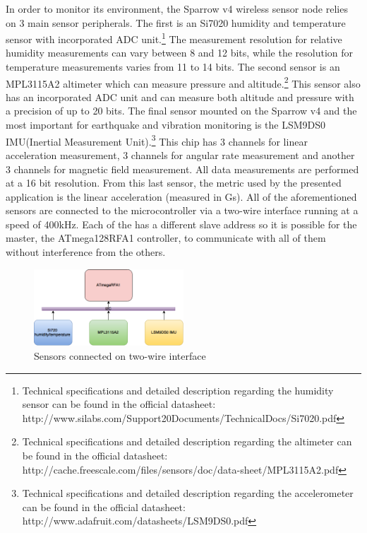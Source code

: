 In order to monitor its environment, the Sparrow v4 wireless sensor node relies on 3 main sensor peripherals. The first is 
an Si7020 humidity and temperature sensor with incorporated ADC unit.\footnote{Technical specifications and detailed description regarding the humidity sensor can be found in the official datasheet: http://www.silabs.com/Support20Documents/TechnicalDocs/Si7020.pdf}
The measurement resolution for relative humidity measurements
can vary between 8 and 12 bits, while the resolution for temperature measurements varies from 11 to 14 bits. The second sensor is 
an MPL3115A2 altimeter which can measure pressure and altitude.\footnote{Technical specifications and detailed description regarding the altimeter can be found in the official datasheet: http://cache.freescale.com/files/sensors/doc/data-sheet/MPL3115A2.pdf} 
This sensor also has an incorporated ADC unit and can measure 
both altitude and pressure with a precision of up to 20 bits. The final sensor mounted on the Sparrow v4 and the most important for 
earthquake and vibration monitoring is the LSM9DS0 IMU(Inertial Measurement Unit).\footnote{Technical specifications and detailed description regarding the accelerometer can be found in the official datasheet: http://www.adafruit.com/datasheets/LSM9DS0.pdf} 
This chip has 3 channels for linear acceleration measurement, 
3 channels for angular rate measurement and another 3 channels for magnetic field measurement. All data measurements are performed at a 
16 bit resolution. From this last sensor, the metric used by the presented application is the linear acceleration (measured in Gs).
All of the aforementioned sensors are connected to the microcontroller via a two-wire interface
running at a speed of 400kHz. Each of the has a different slave address so 
it is possible for the master, the ATmega128RFA1 controller, to communicate with all of them without interference from the others.

\begin{figure}[ht] \centering
  \includegraphics[width=0.5\textwidth]{img/i2c-conn.png}
  \caption{Sensors connected on two-wire interface}
\end{figure}

